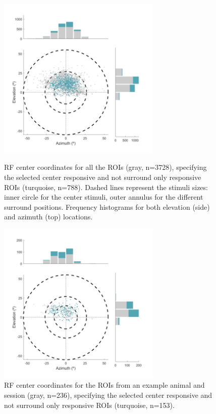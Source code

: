 \begin{figure}[h]
    \centering
    \begin{minipage}[t]{.4\textwidth}
        \centering \includegraphics[width=7.8cm,height=7.8cm,keepaspectratio]{Figures/7.Results/finalPopulation/sel/popPlots_rfPositions_allSessions.png} 
\caption{RF center coordinates for all the ROIs (gray, n=3728), specifying the selected center responsive and not surround only responsive ROIs (turquoise, n=788). Dashed lines represent the stimuli sizes: inner circle for the center stimuli, outer annulus for the different surround positions. Frequency histograms for both elevation (side) and azimuth (top) locations.}
\label{allRF}
\end{minipage}\hspace{1cm}
\begin{minipage}[t]{.4\textwidth}
\centering \includegraphics[width=7.8cm,height=7.8cm,keepaspectratio]{Figures/7.Results/finalPopulation/sel/popPlots_RFpos_Animal4_Session5.png} 
\caption{RF center coordinates for the ROIs from an example animal and session (gray, n=236), specifying the selected center responsive and not surround only responsive ROIs (turquoise, n=153).} 
\label{exRF}
\end{minipage}
\end{figure}


